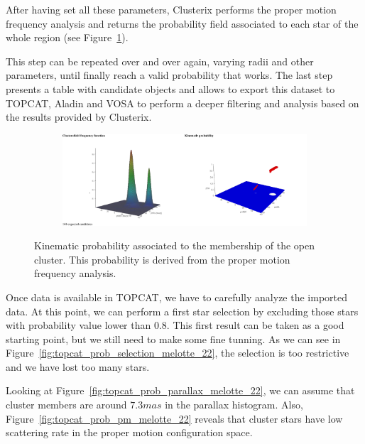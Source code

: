 \documentclass[11pt, a4paper, english]{book}
\begin{document}
After having set all these parameters,
Clusterix performs the proper motion frequency analysis and returns the probability field
associated to each star of the whole region (see Figure~\ref{fig:clusterix_probability_melotte_22}).

This step can be repeated over and over again, varying radii and other parameters,
until finally reach a valid probability that works.
The last step presents a table with candidate objects and allows to export this dataset to TOPCAT,
Aladin and VOSA to perform a deeper filtering and analysis based on the results provided by Clusterix.

\begin{figure}[htbp]
  \centering
  \begin{subfigure}{0.9\textwidth}
    \centering
    \includegraphics[width=\textwidth]{../figures/clusterix/clusterix_probability_melotte_22.pdf}
  \end{subfigure}
  \caption{Kinematic probability associated to the membership of the open cluster.
           This probability is derived from the proper motion frequency analysis.}
  \label{fig:clusterix_probability_melotte_22}
\end{figure}

Once data is available in TOPCAT, we have to carefully analyze the imported data.
At this point, we can perform a first star selection by excluding those stars with probability value lower than 0.8.
This first result can be taken as a good starting point, but we still need to make some fine tunning.
As we can see in Figure~\ref{fig:topcat_prob_selection_melotte_22},
the selection is too restrictive and we have lost too many stars.

Looking at Figure~\ref{fig:topcat_prob_parallax_melotte_22},
we can assume that cluster members are around \(7.3mas\) in the parallax histogram.
Also, Figure~\ref{fig:topcat_prob_pm_melotte_22} reveals that cluster stars
have low scattering rate in the proper motion configuration space.
\end{document}
